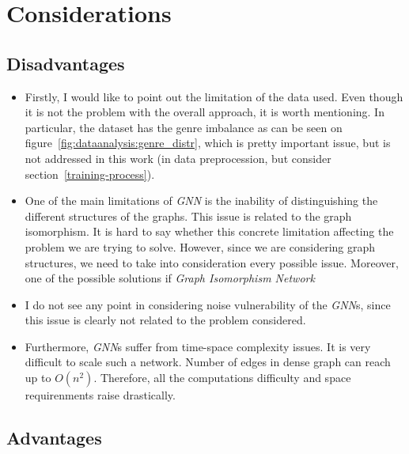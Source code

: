 \section{Considerations}

\subsection{Disadvantages}

\begin{itemize}
      \item Firstly, I would like to point out the limitation of the data used. Even though
            it is not the problem with the overall approach, it is worth mentioning. In
            particular, the dataset has the genre imbalance as can be seen on
            figure~\ref{fig:dataanalysis:genre_distr}, which is pretty important issue, but
            is not addressed in this work (in data preprocession, but consider
            section~\ref{training-process}).
      \item One of the main limitations of \textit{GNN} is the inability of distinguishing
            the different structures of the graphs. This issue is related to the graph
            isomorphism. It is hard to say whether this concrete limitation affecting the
            problem we are trying to solve. However, since we are considering graph
            structures, we need to take into consideration every possible issue. Moreover,
            one of the possible solutions if \textit{Graph Isomorphism
                  Network}~\cite{xuHowPowerfulAre2019}
      \item I do not see any point in considering noise vulnerability of the \textit{GNN}s,
            since this issue is clearly not related to the problem considered.
      \item Furthermore, \textit{GNN}s suffer from time-space complexity issues. It is very
            difficult to scale such a network. Number of edges in dense graph can reach up
            to \(O(n^2)\). Therefore, all the computations difficulty and space
            requirenments raise drastically.
\end{itemize}

\subsection{Advantages}


